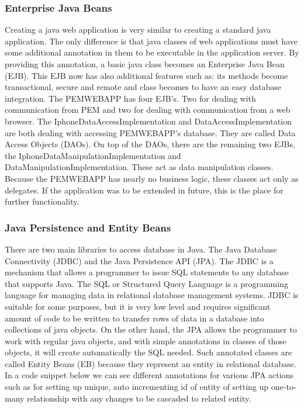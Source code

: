 \documentclass[12pt, a4paper]{report}   %
\begin{document}
\begin{enumerate}
\subsubsection{Enterprise Java Beans}
Creating a java web application is very similar to creating a standard java application. The only difference is that java classes of web applications must have some additional annotation in them to be executable in the application server. By providing this annotation, a basic java class becomes an Enterprise Java Bean (EJB). This EJB now has also additional features such as: its methods become transactional, secure and remote and class becomes to have an easy database integration. The PEMWEBAPP has four EJB's. Two for dealing with communication from PEM and two for dealing with communication from a web browser. The IphoneDataAccessImplementation and DataAccessImplementation are both dealing with accessing PEMWEBAPP's database. They are called Data Access Objects (DAOs). On top of the DAOs, there are the remaining two EJBs, the IphoneDataManipulationImplementation and DataManipulationImplementation. These act as data manipulation classes. Because the PEMWEBAPP has nearly no business logic, these classes act only as delegates. If the application was to be extended in future, this is the place for further functionality.


\subsubsection{Java Persistence and Entity Beans}
There are two main libraries to access database in Java. The Java Database Connectivity (JDBC) and the Java Persistence API (JPA). The JDBC is a mechanism that allows a programmer to issue SQL statements to any database that supports Java. The SQL or Structured Query Language is a programming language for managing data in relational database management systems. JDBC is suitable for some purposes, but it is very low level and requires significant amount of code to be written to transfer rows of data in a database into collections of java objects. On the other hand, the JPA allows the programmer to work with regular java objects, and with simple annotations in classes of those objects, it will create automatically the SQL needed. Such annotated classes are called Entity Beans (EB) because they represent an entity in relational database. In a code snippet below we can see different annotations for various JPA actions such as for setting up unique, auto incrementing id of entity of setting up one-to-many relationship with any changes to be cascaded to related entity.



\end{enumerate}
\end{document}
